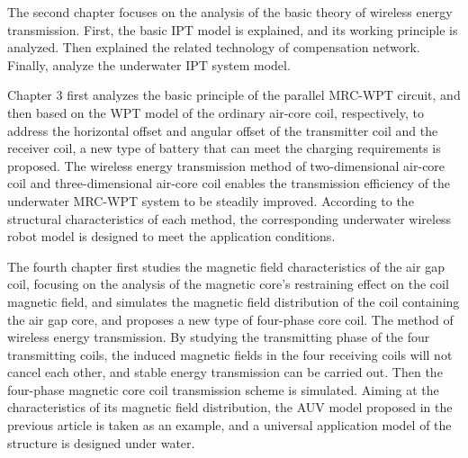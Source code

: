 The second chapter focuses on the analysis of the basic theory of wireless energy transmission. First, the basic IPT model is explained, and its working principle is analyzed. Then explained the related technology of compensation network. Finally, analyze the underwater IPT system model.

Chapter 3 first analyzes the basic principle of the parallel MRC-WPT circuit, and then based on the WPT model of the ordinary air-core coil, respectively, to address the horizontal offset and angular offset of the transmitter coil and the receiver coil, a new type of battery that can meet the charging requirements is proposed. The wireless energy transmission method of two-dimensional air-core coil and three-dimensional air-core coil enables the transmission efficiency of the underwater MRC-WPT system to be steadily improved. According to the structural characteristics of each method, the corresponding underwater wireless robot model is designed to meet the application conditions.

The fourth chapter first studies the magnetic field characteristics of the air gap coil, focusing on the analysis of the magnetic core's restraining effect on the coil magnetic field, and simulates the magnetic field distribution of the coil containing the air gap core, and proposes a new type of four-phase core coil. The method of wireless energy transmission. By studying the transmitting phase of the four transmitting coils, the induced magnetic fields in the four receiving coils will not cancel each other, and stable energy transmission can be carried out. Then the four-phase magnetic core coil transmission scheme is simulated. Aiming at the characteristics of its magnetic field distribution, the AUV model proposed in the previous article is taken as an example, and a universal application model of the structure is designed under water.